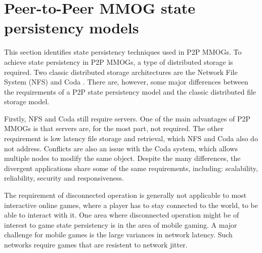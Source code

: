 \documentclass[10pt,a4paper,journal,cspaper,compsoc]{IEEEtran}
\begin{document}
%

\section{Peer-to-Peer MMOG state persistency models}
\label{p2p_mmog_state_persistency}

This section identifies state persistency techniques used in P2P MMOGs. To achieve state persistency in P2P MMOGs, a type of distributed storage is
required. Two classic distributed storage architectures are the Network File System (NFS) \cite{NFS4_protocol} and Coda
\cite{Kistler_Coda_disconnected}. There are, however, some major differences between the requirements of a P2P state persistency model and the
classic distributed file storage model.

Firstly, NFS and Coda still require servers. One of the main advantages of P2P MMOGs is that servers are, for the most part, not required. The other
requirement is low latency file storage and retrieval, which NFS and Coda also do not address. Conflicts are also an issue with the Coda system,
which allows multiple nodes to modify the same object. Despite the many differences, the divergent applications share some of the same requirements,
including: scalability, reliability, security and responsiveness.

The requirement of disconnected operation is generally not applicable to most interactive online games, where a player has to stay connected to the
world, to be able to interact with it. One area where disconnected operation might be of interest to game state persistency is in the area of mobile
gaming. A major challenge for mobile games is the large variances in network latency. Such networks require games that are resistent to network
jitter.
\end{document}
